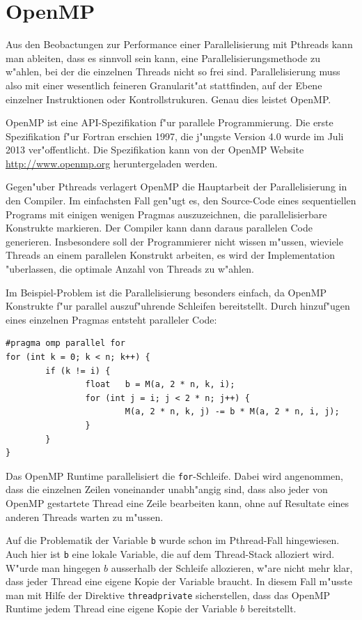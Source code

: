 \section{OpenMP\label{openmp-intro}}
Aus den Beobactungen zur Performance einer Parallelisierung mit
Pthreads kann man ableiten, dass es sinnvoll sein kann,
eine Parallelisierungsmethode zu w"ahlen, bei der die einzelnen
Threads nicht so frei sind.
Parallelisierung muss also mit einer wesentlich feineren Granularit"at
stattfinden, auf der Ebene einzelner Instruktionen oder Kontrollstrukuren.
Genau dies leistet OpenMP.

OpenMP ist eine API-Spezifikation f"ur parallele Programmierung.
Die erste Spezifikation f"ur Fortran erschien 1997, die j"ungste 
Version 4.0 wurde im Juli 2013 ver"offentlicht.
Die Spezifikation kann von der OpenMP Website \url{http://www.openmp.org}
heruntergeladen werden.

Gegen"uber Pthreads verlagert OpenMP die Hauptarbeit der Parallelisierung
in den Compiler. 
Im einfachsten Fall gen"ugt es, den Source-Code eines sequentiellen Programs
mit einigen wenigen Pragmas auszuzeichnen, die parallelisierbare
Konstrukte markieren. Der Compiler kann dann daraus parallelen Code
generieren. Insbesondere soll der Programmierer nicht wissen m"ussen, wieviele
Threads an einem parallelen Konstrukt arbeiten, es wird der Implementation
"uberlassen, die optimale Anzahl von Threads zu w"ahlen.

Im Beispiel-Problem ist die Parallelisierung besonders einfach, da
OpenMP Konstrukte f"ur parallel auszuf"uhrende Schleifen bereitstellt.
Durch hinzuf"ugen eines einzelnen Pragmas entsteht paralleler Code:
\begin{verbatim}
#pragma omp parallel for
for (int k = 0; k < n; k++) {
        if (k != i) {
                float   b = M(a, 2 * n, k, i);
                for (int j = i; j < 2 * n; j++) {
                        M(a, 2 * n, k, j) -= b * M(a, 2 * n, i, j);
                }
        }
}
\end{verbatim}
Das OpenMP Runtime parallelisiert die {\tt for}-Schleife. Dabei wird
angenommen, dass die einzelnen Zeilen voneinander unabh"angig sind, dass
also jeder von OpenMP gestartete Thread eine Zeile bearbeiten kann,
ohne auf Resultate eines anderen Threads warten zu m"ussen.

Auf die Problematik der Variable {\tt b} wurde schon im Pthread-Fall
hingewiesen. Auch hier ist {\tt b} eine lokale Variable, die auf
dem Thread-Stack alloziert wird. W"urde man hingegen $b$ ausserhalb
der Schleife allozieren, w"are nicht mehr klar, dass jeder Thread
eine eigene Kopie der Variable braucht. In diesem Fall m"usste man
mit Hilfe der Direktive {\tt threadprivate} sicherstellen, dass
das OpenMP Runtime jedem Thread eine eigene Kopie der Variable $b$
bereitstellt.

